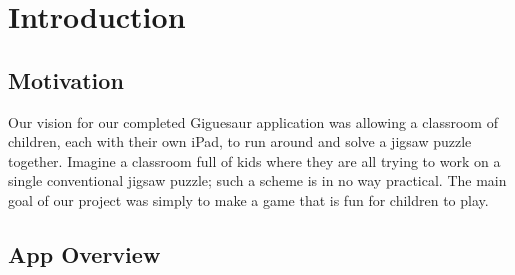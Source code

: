 \documentclass{article}
\begin{document}

\section{Introduction}


\subsection{Motivation}

Our vision for our completed Giguesaur application was allowing a classroom of children, each with their own iPad, to run around and solve a jigsaw puzzle together. Imagine a classroom full of kids where they are all trying to work on a single conventional jigsaw puzzle; such a scheme is in no way practical. The main goal of our project was simply to make a game that is fun for children to play. 

\subsection{App Overview}
\end{document}
